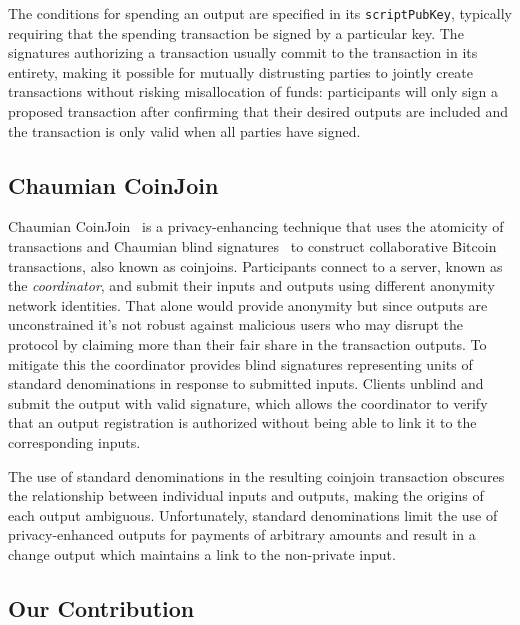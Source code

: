 \documentclass[a4paper]{article}
\begin{document}
The conditions for spending an output are specified in its \texttt{scriptPubKey}, typically requiring that the spending transaction be signed by a particular key. The signatures authorizing a transaction usually commit to the transaction in its entirety, making it possible for mutually distrusting parties to jointly create transactions without risking misallocation of funds: participants will only sign a proposed transaction after confirming that their desired outputs are included and the transaction is only valid when all parties have signed.

\subsection{Chaumian CoinJoin}

Chaumian CoinJoin~\cite{mizrahi2013blind,maxwell2013coinjoin,zerolink} is a privacy-enhancing technique that uses the atomicity of transactions and Chaumian blind signatures~\cite{chaum1983blind} to construct collaborative Bitcoin transactions, also known as coinjoins. Participants connect to a server, known as the \emph{coordinator}, and submit their inputs and outputs using different anonymity network identities. That alone would provide anonymity but since outputs are unconstrained it's not robust against malicious users who may disrupt the protocol by claiming more than their fair share in the transaction outputs. To mitigate this the coordinator provides blind signatures representing units of standard denominations in response to submitted inputs. Clients unblind and submit the output with valid signature, which allows the coordinator to verify that an output registration is authorized without being able to link it to the corresponding inputs.

The use of standard denominations in the resulting coinjoin transaction obscures the relationship between individual inputs and outputs, making the origins of each output ambiguous. Unfortunately, standard denominations limit the use of privacy-enhanced outputs for payments of arbitrary amounts and result in a change output which maintains a link to the non-private input.

\subsection{Our Contribution}
\end{document}
